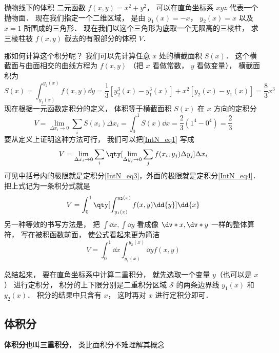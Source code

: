 \begin{example}{抛物线下的体积}\label{IntN_ex1}
二元函数 $f(x,y) = x^2 + y^2$， 可以在直角坐标系 $xyz$ 代表一个抛物面． 现在我们指定一个二维区域， 是由 $y_1(x) = -x$， $y_2(x) = x$ 以及 $x = 1$ 所围成的三角形． 现在我们以这个三角形为底取一个无限高的三棱柱， 求三棱柱被 $f(x,y)$ 截去的有限部分的体积 $V$． %

那如何计算这个积分呢？ 我们可以先计算任意 $x$ 处的横截面积 $S(x)$． 这个横截面与曲面相交的曲线方程为 $f(x,y)$ （把 $x$ 看做常数， $y$ 看做变量）， 横截面积为
\begin{equation}\label{IntN_eq3}
S(x) = \int_{y_1(x)}^{y_2(x)} f(x,y) \dd{y} = \frac13 [y_2^3(x) - y_1^3(x)] + x^2[y_2(x) - y_1(x)] = \frac83 x^3
\end{equation}
现在根据一元函数定积分的定义， 体积等于横截面积 $S(x)$ 在 $x$ 方向的定积分
\begin{equation}\label{IntN_eq4}
V = \lim_{\Delta x_i\to 0} \sum_{i} S(x_i) \Delta x_i = \int_0^1 S(x) \dd{x} = \frac23 (1^4 -0^4) = \frac23
\end{equation}
要从定义上证明这种方法可行， 我们可以把\autoref{IntN_eq1} 写成
\begin{equation}
V = \lim_{\Delta x_i\to 0} \sum_{i} \qty[\lim_{\Delta y_j\to 0}\sum_{j} f(x_i,y_j) \Delta y_j ] \Delta x_i
\end{equation}
可见中括号内的极限就是定积分\autoref{IntN_eq3}，外面的极限就是定积分\autoref{IntN_eq4}． 把上式记为一条积分式就是
\begin{equation}
V = \int_0^1 \qty[\int_{y_1(x)}^{y_2(x)} f(x,y) \dd{y}] \dd{x}
\end{equation}
另一种等效的书写方法是， 把 $\int \dd{x}, \int \dd{y}$ 看成像 $\dv*{x}, \dv*{y}$ 一样的整体算符， 写在被积函数前面， 使公式看起来更为简洁
\begin{equation}\label{IntN_eq7}
V = \int_0^1 \dd{x} \int_{y_1(x)}^{y_2(x)} \dd{y} f(x,y)
\end{equation}
\end{example}

总结起来， 要在直角坐标系中计算二重积分， 就先选取一个变量 $y$（也可以是 $x$） 进行定积分， 积分的上下限分别是二重积分区域 $\mathcal{S}$ 的两条边界线 $y_1(x)$ 和 $y_2(x)$． 积分的结果中只含有 $x$， 这时再对 $x$ 进行定积分即可．


\subsection{体积分}
\textbf{体积分}也叫\textbf{三重积分}， 类比面积分不难理解其概念

